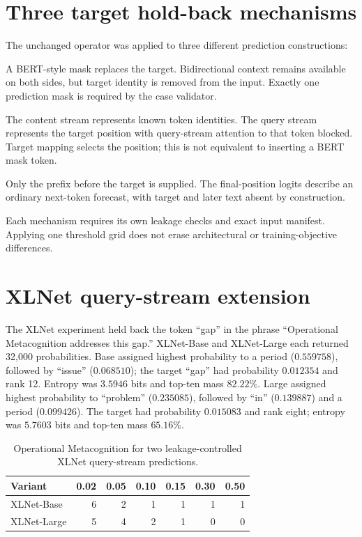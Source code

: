 \section{Three target hold-back mechanisms}
The unchanged operator was applied to three different prediction constructions:
\begin{description}[style=nextline]
  \item[Masked-language modeling.] A BERT-style mask replaces the target. Bidirectional context remains available on both sides, but target identity is removed from the input. Exactly one prediction mask is required by the case validator.
  \item[XLNet query-stream prediction.] The content stream represents known token identities. The query stream represents the target position with query-stream attention to that token blocked. Target mapping selects the position; this is not equivalent to inserting a BERT mask token.
  \item[Autoregressive forecasting.] Only the prefix before the target is supplied. The final-position logits describe an ordinary next-token forecast, with target and later text absent by construction.
\end{description}
Each mechanism requires its own leakage checks and exact input manifest. Applying one threshold grid does not erase architectural or training-objective differences.

\section{XLNet query-stream extension}
The XLNet experiment held back the token ``gap'' in the phrase ``Operational Metacognition addresses this gap.'' XLNet-Base and XLNet-Large each returned 32,000 probabilities. Base assigned highest probability to a period ($0.559758$), followed by ``issue'' ($0.068510$); the target ``gap'' had probability $0.012354$ and rank 12. Entropy was $3.5946$ bits and top-ten mass $82.22\%$. Large assigned highest probability to ``problem'' ($0.235085$), followed by ``in'' ($0.139887$) and a period ($0.099426$). The target had probability $0.015083$ and rank eight; entropy was $5.7603$ bits and top-ten mass $65.16\%$.
\begin{table}[htbp]
\centering
\caption{Operational Metacognition for two leakage-controlled XLNet query-stream predictions.}
\label{tab:xlnet}
\begin{tabular}{lrrrrrr}
\toprule
Variant &0.02&0.05&0.10&0.15&0.30&0.50\\
\midrule
XLNet-Base&6&2&1&1&1&1\\
XLNet-Large&5&4&2&1&0&0\\
\bottomrule
\end{tabular}
\end{table}

